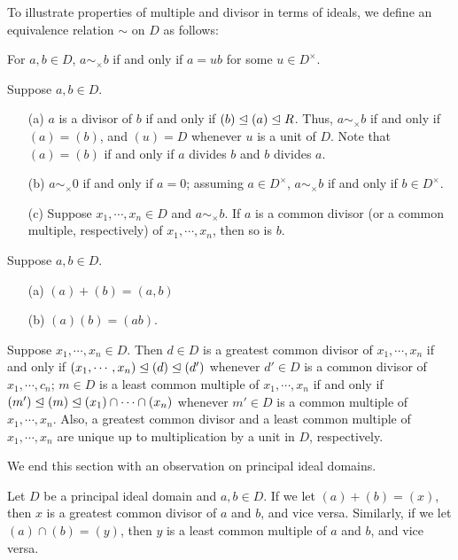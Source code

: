 To illustrate properties of multiple and divisor in terms of ideals, we define an equivalence relation $\sim$ on $D$ as follows:
\begin{center}
    For $a, b\in D$, $a\sim_\times b$ if and only if $a=ub$ for some $u\in D^\times$.
\end{center}
\begin{obs}
    Suppose $a, b\in D$.
    \begin{enumerate}
        \item[(a)]
        {
            $a$ is a divisor of $b$ if and only if $(b)\trianglelefteq (a)\trianglelefteq R$.
            Thus, $a\sim_\times b$ if and only if $(a)=(b)$, and $(u)=D$ whenever $u$ is a unit of $D$.
            Note that $(a)=(b)$ if and only if $a$ divides $b$ and $b$ divides $a$.
        }
        \item[(b)]
        {
            $a\sim_\times 0$ if and only if $a=0$; assuming $a\in D^\times$, $a\sim_\times b$ if and only if $b\in D^\times$.
        }
        \item[(c)]
        {
            Suppose $x_1, \cdots, x_n\in D$ and $a\sim_\times b$.
            If $a$ is a common divisor (or a common multiple, respectively) of $x_1, \cdots, x_n$, then so is $b$.
        }
    \end{enumerate}
\end{obs}

\begin{prop}
    Suppose $a, b\in D$.
    \begin{enumerate}
        \item[(a)]
        {
            $(a)+(b)=(a, b)$
        }
        \item[(b)]
        {
            $(a)(b)=(ab)$.
        }
    \end{enumerate}
\end{prop}

\begin{prop}
    Suppose $x_1, \cdots, x_n\in D$.
    Then $d\in D$ is a greatest common divisor of $x_1, \cdots, x_n$ if and only if $(x_1, \cdots, x_n)\trianglelefteq (d)\trianglelefteq (d')$ whenever $d'\in D$ is a common divisor of $x_1, \cdots, c_n$; $m\in D$ is a least common multiple of $x_1, \cdots, x_n$ if and only if $(m')\trianglelefteq (m)\trianglelefteq (x_1)\cap\cdots\cap(x_n)$ whenever $m'\in D$ is a common multiple of $x_1, \cdots, x_n$.
    Also, a greatest common divisor and a least common multiple of $x_1, \cdots, x_n$ are unique up to multiplication by a unit in $D$, respectively.
\end{prop}

We end this section with an observation on principal ideal domains.
\begin{obs}
    Let $D$ be a principal ideal domain and $a, b\in D$.
    If we let $(a)+(b)=(x)$, then $x$ is a greatest common divisor of $a$ and $b$, and vice versa.
    Similarly, if we let $(a)\cap(b)=(y)$, then $y$ is a least common multiple of $a$ and $b$, and vice versa.
\end{obs}